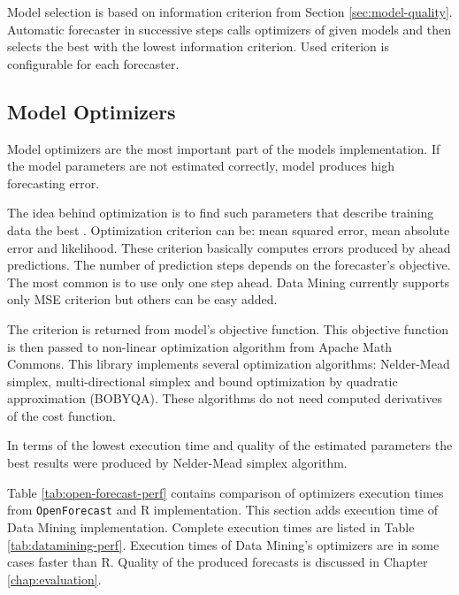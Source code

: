         Model selection is based on information criterion from Section \ref{sec:model-quality}. Automatic forecaster in
        successive steps calls optimizers of given models and then selects the best with the lowest information
        criterion. Used criterion is configurable for each forecaster.

        \subsection{Model Optimizers}
        Model optimizers are the most important part of the models implementation. If the model parameters are not
        estimated correctly, model produces high forecasting error.

        The idea behind optimization is to find such
        parameters that describe training data the best \cite{hyndman-state-space}. Optimization criterion can be: mean
        squared error, mean absolute error and likelihood. These criterion basically computes errors produced by ahead
        predictions. The number of prediction steps depends on the forecaster's objective. The most common is to use
        only one step ahead. Data Mining currently supports only MSE criterion but others can be easy added.

        The criterion is returned from model's objective function. This objective function is then passed to non-linear
        optimization algorithm from Apache Math Commons. This library implements several optimization algorithms:
        Nelder-Mead simplex, multi-directional simplex and bound optimization by quadratic approximation (BOBYQA).
        These algorithms do not need computed derivatives of the cost function.

        In terms of the lowest execution time and quality of the estimated parameters the best results were produced by
        Nelder-Mead simplex algorithm.

        Table \ref{tab:open-forecast-perf} contains comparison of optimizers execution times from \texttt{OpenForecast}
        and R implementation. This section adds execution time of Data Mining implementation. Complete execution times
        are listed in Table \ref{tab:datamining-perf}. Execution times of Data Mining's optimizers are in some
        cases faster than R. Quality of the produced forecasts is discussed in Chapter \ref{chap:evaluation}.

